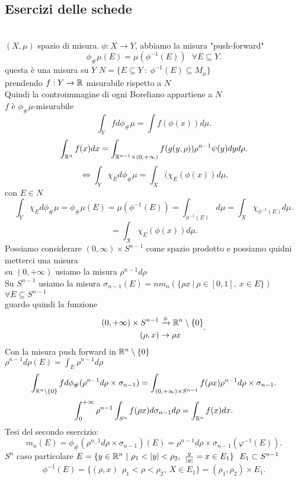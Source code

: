 \documentclass[12px]{article}
\begin{document}
		\subsection{Esercizi delle schede}\\
$(X,\mu)$ spazio di misura.  $\phi: X \rightarrow Y$, abbiamo la misura "push-forward" \[
	\phi_\# \mu(E) = \mu( \phi^{-1}(E))\ \  \ \forall E\subseteq Y
.\] 
questa è una misura su $Y$  $N=\{E\subseteq Y\ : \ \phi^{-1}(E)\subseteq M_\mu\}$\\
prendendo $f: Y \rightarrow\mathbb{R}$  misurabile rispetto a $N$ \\
Quindi la controimmagine di ogni Boreliano appartiene a $N$\\
 $f$ è  $\phi_\#\mu$-misurabile
  \[
 \int_Y fd \phi_\#\mu = \int f(\phi(x))d\mu
 .\] 
 \[
	 \int_{\mathbb{R}^n}f(x)dx = \int_{\mathbb{R}^{n-1}\times (0,+\infty)}f(g(y,\rho))\rho^{n-1}\psi(y)dyd\rho
 .\] 
 \[
	 \Leftrightarrow\int_Y\chi_E d\phi_\# \mu = \int_X(\chi_{E}(\phi(x))d\mu
 .\] 
 con $E\in N$
 \[
	 \int_Y\chi_Ed\phi_\#\mu = \phi_\#\mu(E) = \mu( \phi^{-1}(E)) = \int_{\phi^{-1}(E)}d\mu = \int_X\chi_{\phi^{-1}(E)}d\mu
 .\] 
 \[
  =\int_X \chi_E(\phi(x))d\mu
 .\] 
 Possiamo considerare
 $(0,\infty)\times S^{n-1}$ come spazio  prodotto e possiamo quidni metterci una misura\\
 su   $(0,+\infty)$ usiamo la misura $\rho^{n-1}d\rho$\\
 Su  $S^{n-1}$ usiamo la misura  $\sigma_{n-1}(E) = nm_n(\{\rho x\ | \ \rho\in [0,1], \ x\in E\})$   $\forall E\subseteq S^{n-1}$ \\
 guardo quindi la funzione
 \[
 \begin{aligned}
	 (0,+\infty)\times S^{n-1} &\xrightarrow {\phi} \mathbb{R}^n\setminus\{0\}\\
	 (\rho, x) &\rightarrow \rho x
 \end{aligned}
 .\] 
 Con la misura push forward in $\mathbb{R}^n\setminus\{0\}$ \\
 $\rho^{n-1}d\rho(E) = \int_E\rho^{n-1}d\rho$
 \[
	 \int_{\mathbb{R}^n\setminus\{0\}}fd\phi_\# (\rho^{n-1}d\rho \times\sigma_{n-1}) = \int_{(0,+\infty)\times S^{n-1}}f(\rho x)\rho^{n-1}d \rho\times\sigma_{n-1}
 .\] 
 \[
	 \int_0^{+\infty}\rho^{n-1}\int_{S^n}f (\rho x) d\sigma_{n-1} d\rho = \int_{\mathbb{R}^n}f(x) dx
 .\] 
 Tesi del secondo esercizio:
 \[
	 m_n(E) = \phi_\# (\rho^{n_-1}d\rho\times\sigma_{n-1})(E)	 =\rho^{n-1}d\rho\times\sigma_{n-1}( \varphi^{-1}(E))
 .\] 
 $S^n$ caso particolare  $E = \{y\in \R^n\ | \ \rho_1< |y| < \rho_2,\  \frac{y}{|y|}= x\in E_1\}\ \ E_1\subset S^{n-1}$
\[
	\phi^{-1}(E) = \{(\rho, x)\ \ \rho_1 < \rho< \rho_2, \ X\in E_1\} = (\rho_1,\rho_2)\times E_1
.\] \\
\end{document}
